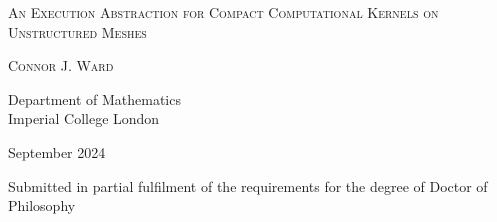 \begin{titlepage}
  \begin{center}
    \vspace*{1cm}

    \LARGE
    \textsc{An Execution Abstraction for Compact Computational Kernels on Unstructured Meshes}

    \vspace{1.5cm}

    \Large
    \textsc{Connor J. Ward}

    \vspace{5cm}

    \large

    Department of Mathematics \\
    Imperial College London

    \vspace{1cm}

    September 2024

    \vfill

    \begin{minipage}{.7\textwidth}
      \centering
      Submitted in partial fulfilment of the requirements for the degree of Doctor of Philosophy
    \end{minipage}

    \vspace{0.8cm}
  \end{center}
\end{titlepage}
